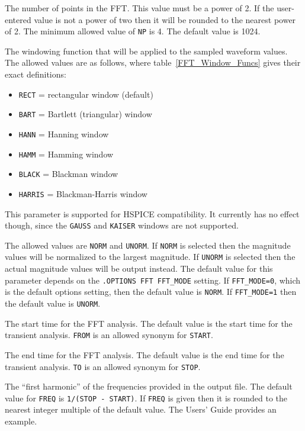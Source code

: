 \begin{Command}
\begin {Arguments}
The number of points in the FFT.  This value must be a power of 2.  If
the user-entered value is not a power of two then it will be rounded to
the nearest power of 2.  The minimum allowed value of {\tt NP} is 4.
The default value is 1024.

The windowing function that will be applied to the sampled waveform
values.  The allowed values are as follows, where table~\ref{FFT_Window_Funcs}
gives their exact definitions:

\begin{itemize}
  \item \texttt{RECT} = rectangular window (default)
  \item \texttt{BART} = Bartlett (triangular) window
  \item \texttt{HANN} = Hanning window
  \item \texttt{HAMM} = Hamming window
  \item \texttt{BLACK} = Blackman window
  \item \texttt{HARRIS} = Blackman-Harris window
\end{itemize}

This parameter is supported for HSPICE compatibility. It currently
has no effect though, since the {\tt GAUSS} and {\tt KAISER} windows
are not supported.

The allowed values are {\tt NORM} and {\tt UNORM}.  If {\tt NORM} is
selected then the magnitude values will be normalized to the largest
magnitude.  If {\tt UNORM} is selected then the actual magnitude values
will be output instead.  The default value for this parameter depends
on the \texttt{.OPTIONS FFT FFT\_MODE} setting.  If \texttt{FFT\_MODE=0},
which is the default options setting, then the default value is {\tt NORM}.
If \texttt{FFT\_MODE=1} then the default value is {\tt UNORM}.

The start time for the FFT analysis.  The default value is the
start time for the transient analysis. {\tt FROM} is an allowed
synonym for {\tt START}.

The end time for the FFT analysis.  The default value is the
end time for the transient analysis. {\tt TO} is an allowed
synonym for {\tt STOP}.

The ``first harmonic'' of the frequencies provided in the output
file.  The default value for {\tt FREQ} is {\tt 1/(STOP - START)}.
If {\tt FREQ} is given then it is rounded to the nearest integer
multiple of the default value.  The \Xyce{} Users' Guide\UsersGuide
provides an example.


\end{Arguments}
\end{Command}
